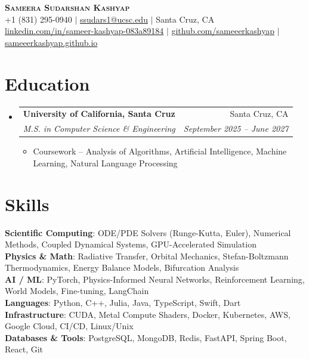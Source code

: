 \documentclass[letterpaper,10pt]{article}
\makeatletter
\newcommand{\resumeItem}[1]{
  \item\small{{#1 \vspace{-2pt}}}
}
\newcommand{\resumeSubheading}[4]{
  \vspace{-2pt}\item
    \begin{tabular*}{0.97\textwidth}[t]{l@{\extracolsep{\fill}}r}
      \textbf{#1} & #2 \\
      \textit{\small#3} & \textit{\small #4} \\
    \end{tabular*}\vspace{-7pt}
}
\newcommand{\resumeSubHeadingListStart}{\begin{itemize}[leftmargin=0.15in, label={}]}
\newcommand{\resumeSubHeadingListEnd}{\end{itemize}}
\newcommand{\resumeItemListStart}{\begin{itemize}}
\newcommand{\resumeItemListEnd}{\end{itemize}\vspace{-5pt}}
\makeatother
\begin{document}
\begin{center}
   \textbf{\Huge \scshape Sameera Sudarshan Kashyap} \\[2pt]
   \small +1 (831) 295-0940 $|$ \href{mailto:ssudars1@ucsc.edu}{ssudars1@ucsc.edu} $|$ Santa Cruz, CA \\ \vspace{1pt}
    \href{https://linkedin.com/in/sameer-kashyap-083a89184}{linkedin.com/in/sameer-kashyap-083a89184} $|$
    \href{https://github.com/sameeerkashyap}{github.com/sameeerkashyap} $|$
    \href{https://sameeerkashyap.github.io}{sameeerkashyap.github.io}
\end{center}


\section{Education}
  \resumeSubHeadingListStart
    \resumeSubheading
      {University of California, Santa Cruz}{Santa Cruz, CA}
      {M.S. in Computer Science \& Engineering}{September 2025 -- June 2027}
    \resumeItemListStart
      \resumeItem{Coursework -- Analysis of Algorithms, Artificial Intelligence, Machine Learning, Natural Language Processing}
    \resumeItemListEnd
  \resumeSubHeadingListEnd


\section{Skills}
 \begin{itemize}[leftmargin=0.15in, label={}]
    \small{\item{
     \textbf{Scientific Computing}{: ODE/PDE Solvers (Runge-Kutta, Euler), Numerical Methods, Coupled Dynamical Systems, GPU-Accelerated Simulation} \\
     \textbf{Physics \& Math}{: Radiative Transfer, Orbital Mechanics, Stefan-Boltzmann Thermodynamics, Energy Balance Models, Bifurcation Analysis} \\
     \textbf{AI / ML}{: PyTorch, Physics-Informed Neural Networks, Reinforcement Learning, World Models, Fine-tuning, LangChain} \\
     \textbf{Languages}{: Python, C++, Julia, Java, TypeScript, Swift, Dart} \\
     \textbf{Infrastructure}{: CUDA, Metal Compute Shaders, Docker, Kubernetes, AWS, Google Cloud, CI/CD, Linux/Unix} \\
     \textbf{Databases \& Tools}{: PostgreSQL, MongoDB, Redis, FastAPI, Spring Boot, React, Git}
    }}
 \end{itemize}
\end{document}
